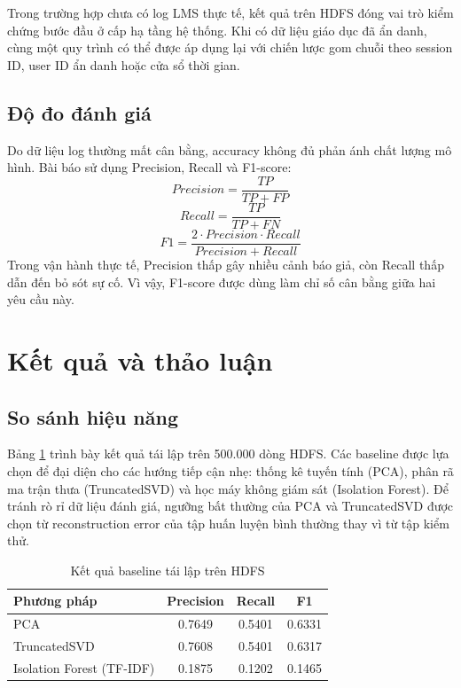 \documentclass[conference]{IEEEtran}
\begin{document}
Trong trường hợp chưa có log LMS thực tế, kết quả trên HDFS đóng vai trò kiểm chứng bước đầu ở cấp hạ tầng hệ thống. Khi có dữ liệu giáo dục đã ẩn danh, cùng một quy trình có thể được áp dụng lại với chiến lược gom chuỗi theo session ID, user ID ẩn danh hoặc cửa sổ thời gian.

\subsection{Độ đo đánh giá}
Do dữ liệu log thường mất cân bằng, accuracy không đủ phản ánh chất lượng mô hình. Bài báo sử dụng Precision, Recall và F1-score:
\begin{equation}
Precision = \frac{TP}{TP + FP}
\end{equation}
\begin{equation}
Recall = \frac{TP}{TP + FN}
\end{equation}
\begin{equation}
F1 = \frac{2 \cdot Precision \cdot Recall}{Precision + Recall}
\label{eq_f1}
\end{equation}
Trong vận hành thực tế, Precision thấp gây nhiều cảnh báo giả, còn Recall thấp dẫn đến bỏ sót sự cố. Vì vậy, F1-score được dùng làm chỉ số cân bằng giữa hai yêu cầu này.

\section{Kết quả và thảo luận}
\subsection{So sánh hiệu năng}
Bảng \ref{tab_results} trình bày kết quả tái lập trên 500.000 dòng HDFS. Các baseline được lựa chọn để đại diện cho các hướng tiếp cận nhẹ: thống kê tuyến tính (PCA), phân rã ma trận thưa (TruncatedSVD) và học máy không giám sát (Isolation Forest). Để tránh rò rỉ dữ liệu đánh giá, ngưỡng bất thường của PCA và TruncatedSVD được chọn từ reconstruction error của tập huấn luyện bình thường thay vì từ tập kiểm thử.

\begin{table}[htbp]
\caption{Kết quả baseline tái lập trên HDFS}
\begin{center}
\begin{tabular}{lccc}
\toprule
\textbf{Phương pháp} & \textbf{Precision} & \textbf{Recall} & \textbf{F1} \\
\midrule
PCA & 0.7649 & 0.5401 & 0.6331 \\
TruncatedSVD & 0.7608 & 0.5401 & 0.6317 \\
Isolation Forest (TF-IDF) & 0.1875 & 0.1202 & 0.1465 \\
\bottomrule
\end{tabular}
\label{tab_results}
\end{center}
\end{table}
\end{document}
